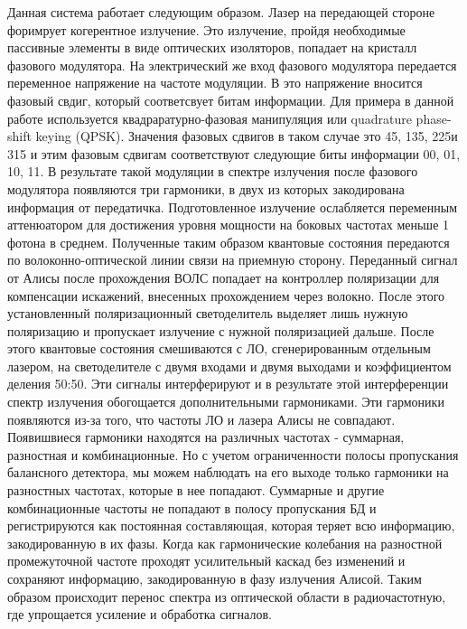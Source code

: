 Данная система работает следующим образом. Лазер на передающей стороне форимрует когерентное излучение. Это излучение, пройдя необходимые пассивные элементы в виде оптических изоляторов, попадает на  кристалл фазового модулятора. На электрический же вход фазового модулятора передается переменное напряжение на частоте модуляции. В это напряжение вносится фазовый свдиг, который соответсвует битам информации. Для примера в данной работе используется квадраратурно-фазовая манипуляция или quadrature phase-shift keying (QPSK). Значения фазовых сдвигов в таком случае это {45\textdegree, 135\textdegree, 225\textdegree и 315\textdegree} и этим фазовым сдвигам соответствуют следующие биты информации {00, 01, 10, 11}. В результате такой модуляции в спектре излучения после фазового модулятора появляются три гармоники, в двух из которых закодирована информация от передатичка. Подготовленное излучение ослабляется переменным аттенюатором для достижения уровня мощности на боковых частотах меньше 1 фотона в среднем. Полученные таким образом квантовые состояния передаются по волоконно-оптической линии связи на приемную сторону.  
\newline Переданный сигнал от Алисы после прохождения ВОЛС попадает на контроллер поляризации для компенсации искажений, внесенных прохождением через волокно. После этого установленный поляризационный светоделитель выделяет лишь нужную поляризацию и пропускает излучение с нужной поляризацией дальше. После этого квантовые состояния смешиваются с ЛО, сгенерированным отдельным лазером, на светоделителе с двумя входами и двумя выходами и коэффициентом деления 50:50. Эти сигналы интерферируют и в результате этой интерференции спектр излучения обогощается дополнительными гармониками. Эти гармоники появляются из-за того, что частоты ЛО и лазера Алисы не совпадают. Появишвиеся гармоники находятся на различных частотах - суммарная, разностная и комбинационные. Но с учетом ограниченности полосы пропускания балансного детектора, мы можем наблюдать на его выходе только гармоники на разностных частотах, которые в нее попадают. Суммарные и другие комбинационные частоты не попадают в полосу пропускания БД и регистрируются как постоянная составляющая, которая теряет всю информацию, закодированную в их фазы. Когда как гармонические колебания на разностной промежуточной частоте проходят усилительный каскад без изменений и сохраняют информацию, закодированную в фазу излучения Алисой. Таким образом происходит перенос спектра из оптической области в радиочастотную, где упрощается усиление и обработка сигналов. 
